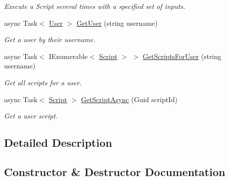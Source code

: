 \begin{DoxyCompactItemize}
\begin{DoxyCompactList}\small\item\em Execute a Script several times with a specified set of inputs. \end{DoxyCompactList}\item 
async Task$<$ \mbox{\hyperlink{class_code_a_friend_1_1_data_model_1_1_user}{User}} $>$ \mbox{\hyperlink{class_code_a_friend_1_1_facade_1_1_code_a_friend_facade_a5cc08aa0377f29fd3f80e1d880059951}{Get\+User}} (string username)
\begin{DoxyCompactList}\small\item\em Get a user by their username. \end{DoxyCompactList}\item 
async Task$<$ I\+Enumerable$<$ \mbox{\hyperlink{class_code_a_friend_1_1_data_model_1_1_script}{Script}} $>$ $>$ \mbox{\hyperlink{class_code_a_friend_1_1_facade_1_1_code_a_friend_facade_a77cd5040946e3a1feaac9fc03cfdb372}{Get\+Scripts\+For\+User}} (string username)
\begin{DoxyCompactList}\small\item\em Get all scripts for a user. \end{DoxyCompactList}\item 
async Task$<$ \mbox{\hyperlink{class_code_a_friend_1_1_data_model_1_1_script}{Script}} $>$ \mbox{\hyperlink{class_code_a_friend_1_1_facade_1_1_code_a_friend_facade_aaf0ac4c19567b0078140ab3d6a457e15}{Get\+Script\+Async}} (Guid script\+Id)
\begin{DoxyCompactList}\small\item\em Get a user script. \end{DoxyCompactList}\end{DoxyCompactItemize}


\subsection{Detailed Description}


\subsection{Constructor \& Destructor Documentation}
\mbox{\label{class_code_a_friend_1_1_facade_1_1_code_a_friend_facade_a97f88a6ad57d442f503cbd0aa3de95ae}} 
